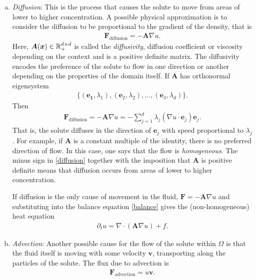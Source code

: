 \documentclass[
    a4paper,
    DIV=14,
    abstract=true,
    numbers=noenddot
]{scrartcl}
\begin{document}
\begin{enumerate}[a)]
	\item \emph{Diffusion}: This is the process that causes the solute to move from areas of lower to higher concentration. A possible physical approximation is to consider the diffusion to be proportional to the gradient of the density, that is
	      \begin{align*}
		      \bm{F}_{\text{diffusion}} = -\bm{A}\nabla u  .
	      \end{align*}
	      Here, $\bm{A}(\bm{x} ) \in \mathbb{R}^{d\times d}_+$ is called the \emph{diffusivity}, diffusion coefficient or viscosity depending on the context and is a positive definite matrix. The diffusivity encodes the preference of the solute to flow in one direction or another depending on the properties of the domain itself. If $\bm{A}$ has orthonormal eigensystem
	      \begin{align*}
		      \{(\bm{e_1},\lambda _1 ),(\bm{e}_2, \lambda _2 ),\ldots, (\bm{e}_3 ,\lambda _d)\} .
	      \end{align*}
	      Then
	      \begin{align}\label{diffusion}
		      \bm{F}_{\text{diffusion}} = -\bm{A}\nabla u=- \sum_{j=1}^d  \lambda _j(\nabla u\cdot \bm{e}_j )\bm{e}_j .
	      \end{align}
	      That is, the solute diffuses in the direction of $\bm{e}_j $ with speed proportional to $\lambda_j$. For example, if $\bm{A} $ is a constant multiple of the identity, there is no preferred direction of flow. In this case, one says that the flow is \emph{homogeneous}. The minus sign in \eqref{diffusion} together with the imposition that $\bm{A} $ is positive definite means that diffusion occurs from areas of lower to higher concentration.

	      If diffusion is the only cause of movement in the fluid, $\bm{F}= - \bm{A}\nabla u $ and substituting  into the balance equation \eqref{balance} gives the (non-homogeneous) heat equation
	      \begin{align*}
		      \partial_tu= \nabla \cdot (\bm{A}\nabla u)+f .
	      \end{align*}
	\item \emph{Advection}: Another possible cause for the flow of the solute within $\Omega$ is that the fluid itself is moving with some velocity  $\bm{v}$, transporting along the particles of the solute. The flux due to advection is
	      \begin{align*}
		      \bm{F}_{\text{advection} }= u \bm{v} .
	      \end{align*}
\end{enumerate}
\end{document}
